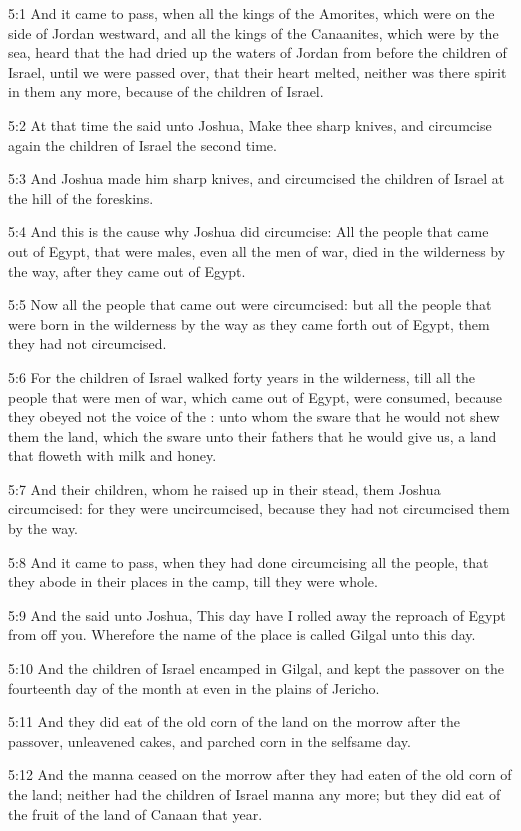 5:1 And it came to pass, when all the kings of the Amorites, which
were on the side of Jordan westward, and all the kings of the
Canaanites, which were by the sea, heard that the \LORD had dried up
the waters of Jordan from before the children of Israel, until we were
passed over, that their heart melted, neither was there spirit in them
any more, because of the children of Israel.

5:2 At that time the \LORD said unto Joshua, Make thee sharp knives,
and circumcise again the children of Israel the second time.

5:3 And Joshua made him sharp knives, and circumcised the children of
Israel at the hill of the foreskins.

5:4 And this is the cause why Joshua did circumcise: All the people
that came out of Egypt, that were males, even all the men of war, died
in the wilderness by the way, after they came out of Egypt.

5:5 Now all the people that came out were circumcised: but all the
people that were born in the wilderness by the way as they came forth
out of Egypt, them they had not circumcised.

5:6 For the children of Israel walked forty years in the wilderness,
till all the people that were men of war, which came out of Egypt,
were consumed, because they obeyed not the voice of the \LORD: unto
whom the \LORD sware that he would not shew them the land, which the
\LORD sware unto their fathers that he would give us, a land that
floweth with milk and honey.

5:7 And their children, whom he raised up in their stead, them Joshua
circumcised: for they were uncircumcised, because they had not
circumcised them by the way.

5:8 And it came to pass, when they had done circumcising all the
people, that they abode in their places in the camp, till they were
whole.

5:9 And the \LORD said unto Joshua, This day have I rolled away the
reproach of Egypt from off you. Wherefore the name of the place is
called Gilgal unto this day.

5:10 And the children of Israel encamped in Gilgal, and kept the
passover on the fourteenth day of the month at even in the plains of
Jericho.

5:11 And they did eat of the old corn of the land on the morrow after
the passover, unleavened cakes, and parched corn in the selfsame day.

5:12 And the manna ceased on the morrow after they had eaten of the
old corn of the land; neither had the children of Israel manna any
more; but they did eat of the fruit of the land of Canaan that year.

